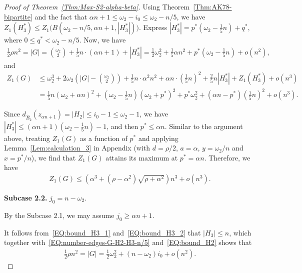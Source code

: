 \documentclass[11pt,a4paper]{article}
\begin{document}
\begin{proof}[Proof of Theorem~\ref{Thm:Max-S2-alpha-beta}]
Using Theorem~\ref{Thm:AK78-bipartite} and the fact that $\alpha n + 1 \le \omega_2 -i_0 \le \omega_2 - n/5$, we have $Z_{1}(H_3^{\ast}) \le Z_{1}\big(B(\omega_2 - n/5, \alpha n+1, |H_3^{\ast}|)\big)$. 
Express $|H_3^{\ast}|= p^{\ast} \left(\omega_2 - \frac{1}{5}n\right) + q^{\ast}$, where $0 \le q^{\ast} < \omega_2 - n/5$. 
Now, we have 
\begin{align*}
\frac{1}{2} \rho n^2
= |G| 
= \binom{\omega_2}{2} + \frac{1}{5}n \cdot \left(\alpha n+1\right) +|H_3^{\ast}|
= \frac{1}{2}\omega_2^2 + \frac{1}{5} \alpha n^2+ p^{\ast} \left(\omega_2 - \frac{1}{5}n\right)+o(n^2), 
\end{align*}
and 
\begin{align*}
Z_{1}(G)
& \le \omega_2^3 + 2\omega_2 \left(|G| - \binom{\omega_2}{2}\right) + \frac{1}{5}n \cdot \alpha^2 n^2 + \alpha n \cdot \left(\frac{1}{5}n\right)^2+ \frac{2}{5}n |H_3^{\ast}|+Z_{1}(H_3^{\ast})+o(n^3)\\
&= \frac{1}{5}n (\omega_2 +\alpha n)^2 + \left(\omega_2 - \frac{1}{5}n\right) (\omega_2 + p^{\ast})^2 + p^{\ast} \omega_2^2 + \left(\alpha n - p^{\ast}\right) \left(\frac{1}{5}n\right)^2 + o(n^3).
\end{align*}

Since $d_{\hat{B}_2}(z_{\alpha n+1}) = |H_2| \le i_0 -1 \le \omega_2 -1$, we have $|H_3^{\ast}| \le (\alpha n +1)\left(\omega_2 -\frac{1}{5}n\right) - 1$, and then $p^{\ast} \le \alpha n$. 
Similar to the argument above, treating $Z_{1}(G)$ as a function of $p^{\ast}$ and applying Lemma~\ref{Lem:calculation_3} in Appendix (with $d =\rho/2$, $a = \alpha$, $y =\omega_2/n$ and $x= p^{\ast}/n$), we find that $Z_{1}(G)$ attains its maximum at $p^{\ast} = \alpha n$. 
Therefore, we have
\begin{align*}
Z_{1}(G) 
\le \left(\alpha^3+(\rho-\alpha^2) \sqrt{\rho+\alpha^2}\right)n^3 + o(n^3).
\end{align*}

\textbf{Subcase 2.2. } $j_0 = n- \omega_2$. 

By the Subcase 2.1, we may assume $j_0 \ge \alpha n+1$. 

It follows from~\eqref{EQ:bound_H3_1} and~\eqref{EQ:bound_H3_2} that $|H_3| \le n$, which together with~\eqref{EQ:number-edges-G-H2-H3-n/5} and~\eqref{EQ:bound_H2} shows that 
\begin{align}\label{EQ:edge-case-j0=n-omega-n/5}
\frac{1}{2} \rho n^2 
= |G| 
= \frac{1}{2}\omega_2^2 + (n-\omega_2) i_0 + o(n^2). 
\end{align}


\end{proof}
\end{document}
